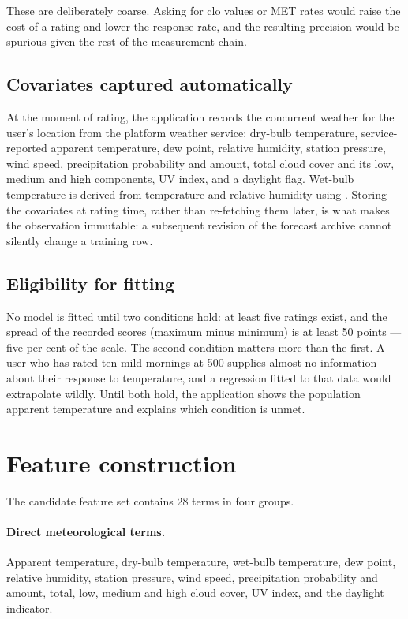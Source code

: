\documentclass[11pt]{article}
\begin{document}
These are deliberately coarse. Asking for clo values or MET rates would raise
the cost of a rating and lower the response rate, and the resulting precision
would be spurious given the rest of the measurement chain.

\subsection{Covariates captured automatically}

At the moment of rating, the application records the concurrent weather for the
user's location from the platform weather service: dry-bulb temperature,
service-reported apparent temperature, dew point, relative humidity, station
pressure, wind speed, precipitation probability and amount, total cloud cover
and its low, medium and high components, UV index, and a daylight flag. Wet-bulb
temperature is derived from temperature and relative humidity using
\citet{stull2011}. Storing the covariates at rating time, rather than
re-fetching them later, is what makes the observation immutable: a subsequent
revision of the forecast archive cannot silently change a training row.

\subsection{Eligibility for fitting}

No model is fitted until two conditions hold: at least five ratings exist, and
the spread of the recorded scores (maximum minus minimum) is at least 50 points
--- five per cent of the scale. The second condition matters more than the
first. A user who has rated ten mild mornings at 500 supplies almost no
information about their response to temperature, and a regression fitted to
that data would extrapolate wildly. Until both hold, the application shows the
population apparent temperature and explains which condition is unmet.

\section{Feature construction}
\label{sec:features}

The candidate feature set contains 28 terms in four groups.

\paragraph{Direct meteorological terms.} Apparent temperature, dry-bulb
temperature, wet-bulb temperature, dew point, relative humidity, station
pressure, wind speed, precipitation probability and amount, total, low, medium
and high cloud cover, UV index, and the daylight indicator.
\end{document}

